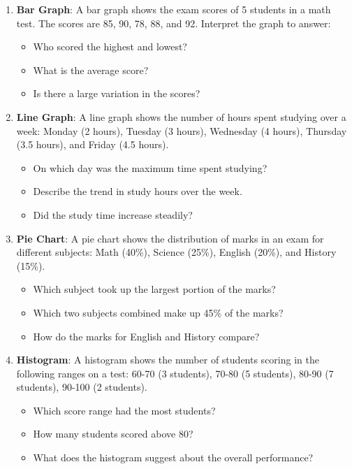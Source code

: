 \begin{enumerate}
    \item \textbf{Bar Graph}: A bar graph shows the exam scores of 5 students in a math test. The scores are 85, 90, 78, 88, and 92. Interpret the graph to answer:
    \begin{itemize}
        \item Who scored the highest and lowest?
        \item What is the average score?
        \item Is there a large variation in the scores?
    \end{itemize}

    \item \textbf{Line Graph}: A line graph shows the number of hours spent studying over a week: Monday (2 hours), Tuesday (3 hours), Wednesday (4 hours), Thursday (3.5 hours), and Friday (4.5 hours).
    \begin{itemize}
        \item On which day was the maximum time spent studying?
        \item Describe the trend in study hours over the week.
        \item Did the study time increase steadily?
    \end{itemize}

    \item \textbf{Pie Chart}: A pie chart shows the distribution of marks in an exam for different subjects: Math (40\%), Science (25\%), English (20\%), and History (15\%).
    \begin{itemize}
        \item Which subject took up the largest portion of the marks?
        \item Which two subjects combined make up 45\% of the marks?
        \item How do the marks for English and History compare?
    \end{itemize}

    \item \textbf{Histogram}: A histogram shows the number of students scoring in the following ranges on a test: 60-70 (3 students), 70-80 (5 students), 80-90 (7 students), 90-100 (2 students).
    \begin{itemize}
        \item Which score range had the most students?
        \item How many students scored above 80?
        \item What does the histogram suggest about the overall performance?
    \end{itemize}


\end{enumerate}
